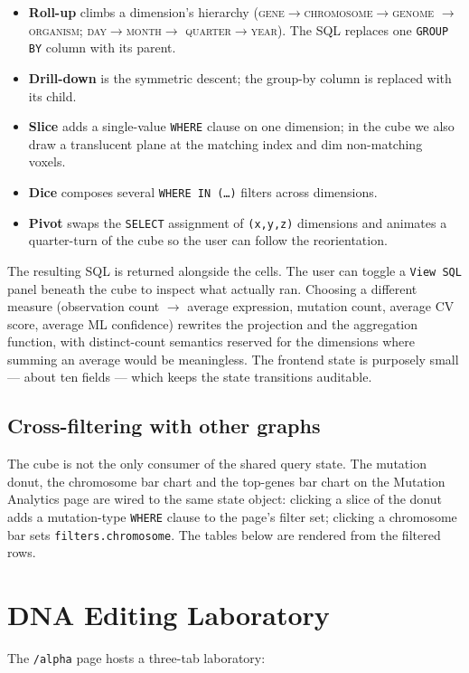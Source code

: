 \documentclass[conference,10pt]{IEEEtran}
\begin{document}
\begin{itemize}
  \item \textbf{Roll-up} climbs a dimension's hierarchy
        (\textsc{gene}$\to$\textsc{chromosome}$\to$\textsc{genome}
        $\to$\textsc{organism}; \textsc{day}$\to$\textsc{month}$\to$
        \textsc{quarter}$\to$\textsc{year}). The SQL replaces one
        \texttt{GROUP BY} column with its parent.
  \item \textbf{Drill-down} is the symmetric descent;
        the group-by column is replaced with its child.
  \item \textbf{Slice} adds a single-value \texttt{WHERE} clause on
        one dimension; in the cube we also draw a translucent plane at
        the matching index and dim non-matching voxels.
  \item \textbf{Dice} composes several \texttt{WHERE IN (\dots)}
        filters across dimensions.
  \item \textbf{Pivot} swaps the \texttt{SELECT} assignment of
        \texttt{(x,y,z)} dimensions and animates a quarter-turn of the
        cube so the user can follow the reorientation.
\end{itemize}

The resulting SQL is returned alongside the cells. The user can toggle
a \texttt{View SQL} panel beneath the cube to inspect what actually ran.
Choosing a different measure (observation count $\to$ average expression,
mutation count, average CV score, average ML confidence) rewrites the
projection and the aggregation function, with distinct-count semantics
reserved for the dimensions where summing an average would be
meaningless. The frontend state is purposely small --- about ten fields
--- which keeps the state transitions auditable.

\subsection*{Cross-filtering with other graphs}
The cube is not the only consumer of the shared query state. The
mutation donut, the chromosome bar chart and the top-genes bar chart on
the Mutation Analytics page are wired to the same state object: clicking
a slice of the donut adds a mutation-type \texttt{WHERE} clause to the
page's filter set; clicking a chromosome bar sets
\texttt{filters.chromosome}. The tables below are rendered from the
filtered rows.

\section{DNA Editing Laboratory}
The \texttt{/alpha} page hosts a three-tab laboratory:
\end{document}
